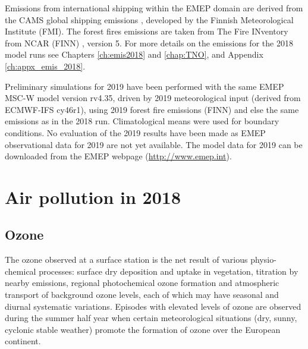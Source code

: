  Emissions from international shipping
 within the EMEP domain are derived from the CAMS global shipping
 emissions \citep{CAMSemis2019}, developed by the Finnish
 Meteorological Institute (FMI). The forest fires emissions are taken from
 The Fire INventory from NCAR (FINN) \citep{FINNIGAN1990}, version 5.
 For more details on the emissions for the 2018 model runs see Chapters
 \ref{ch:emis2018} and \ref{chap:TNO}, and Appendix \ref{ch:appx_emis_2018}.

 Preliminary simulations for 2019 have been performed with the same
 EMEP MSC-W model version rv4.35, driven by 2019 meteorological
 input (derived from ECMWF-IFS cy46r1), using 2019 forest fire emissions (FINN)
 and else the same emissions as in the 2018 run. Climatological
 means were used for boundary conditions. No evaluation of the 2019
 results have been made as EMEP observational data for 2019 are not yet
 available. The model data for 2019 can be downloaded from the EMEP
 webpage (\url{http://www.emep.int}).




\section{Air pollution in 2018} 

\subsection{Ozone}
\label{O3MAX}

The ozone observed at a surface station is the net result of various physio-chemical processes: surface dry deposition and uptake in vegetation, titration by nearby \nox emissions, regional photochemical ozone formation and atmospheric transport of background ozone levels, each of which may have seasonal and diurnal systematic variations. Episodes with elevated levels of ozone are observed during the summer half year when certain meteorological situations (dry, sunny, cyclonic stable weather) promote the formation of ozone over the European continent. 

